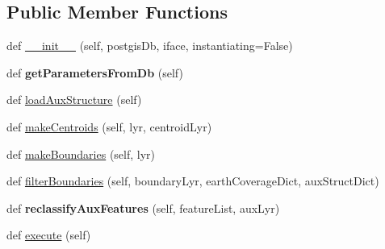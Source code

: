 \subsection*{Public Member Functions}
\begin{DoxyCompactItemize}
\item 
def \mbox{\hyperlink{class_dsg_tools_1_1_validation_tools_1_1_validation_processes_1_1unbuild_earth_coverage_polygons7ae81ba48bc229a22209cc6a70ed6350_ac1cc2766f24cb4f0547c66c1f982f1a3}{\+\_\+\+\_\+init\+\_\+\+\_\+}} (self, postgis\+Db, iface, instantiating=False)
\item 
\mbox{\label{class_dsg_tools_1_1_validation_tools_1_1_validation_processes_1_1unbuild_earth_coverage_polygons7ae81ba48bc229a22209cc6a70ed6350_aa6e96669dfcd0c43d0e314f9a5f73067}} 
def {\bfseries get\+Parameters\+From\+Db} (self)
\item 
def \mbox{\hyperlink{class_dsg_tools_1_1_validation_tools_1_1_validation_processes_1_1unbuild_earth_coverage_polygons7ae81ba48bc229a22209cc6a70ed6350_abcffe9ae8a901c2236bbc089ed8653fd}{load\+Aux\+Structure}} (self)
\item 
def \mbox{\hyperlink{class_dsg_tools_1_1_validation_tools_1_1_validation_processes_1_1unbuild_earth_coverage_polygons7ae81ba48bc229a22209cc6a70ed6350_a9eb6d71d9daafa25abbcf1c3fd55cd42}{make\+Centroids}} (self, lyr, centroid\+Lyr)
\item 
def \mbox{\hyperlink{class_dsg_tools_1_1_validation_tools_1_1_validation_processes_1_1unbuild_earth_coverage_polygons7ae81ba48bc229a22209cc6a70ed6350_ab4e235179a03963d8c6e4637ed32f756}{make\+Boundaries}} (self, lyr)
\item 
def \mbox{\hyperlink{class_dsg_tools_1_1_validation_tools_1_1_validation_processes_1_1unbuild_earth_coverage_polygons7ae81ba48bc229a22209cc6a70ed6350_ab5148068a333833ef6d6460ace9409e3}{filter\+Boundaries}} (self, boundary\+Lyr, earth\+Coverage\+Dict, aux\+Struct\+Dict)
\item 
\mbox{\label{class_dsg_tools_1_1_validation_tools_1_1_validation_processes_1_1unbuild_earth_coverage_polygons7ae81ba48bc229a22209cc6a70ed6350_af579824beb5eb7e9a9bbd8a12973a86a}} 
def {\bfseries reclassify\+Aux\+Features} (self, feature\+List, aux\+Lyr)
\item 
def \mbox{\hyperlink{class_dsg_tools_1_1_validation_tools_1_1_validation_processes_1_1unbuild_earth_coverage_polygons7ae81ba48bc229a22209cc6a70ed6350_ad98a140d51a671d6faac47a24f17823b}{execute}} (self)
\end{DoxyCompactItemize}
